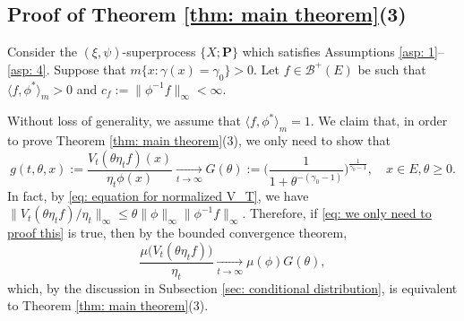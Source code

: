 \documentclass[12pt, a4paper]{amsart}
\theoremstyle{definition}
\numberwithin{equation}{section}
\begin{document}
\subsection{Proof of Theorem \ref{thm: main theorem}(3)}
\label{sec: proof of result 3}
	Consider the $(\xi, \psi)$-superprocess $\{X;\mathbf P\}$ which satisfies
	Assumptions \ref{asp: 1}--\ref{asp: 4}.
	Suppose that $m\{ x:\gamma(x)=\gamma_0 \}>0$.
	Let $f \in \mathscr B^+(E)$ be  such that $ \langle f, \phi^* \rangle_m > 0$  and $c_f :=\| \phi^{-1}f \|_\infty < \infty$.
	
	Without loss of generality, we assume that $\langle f, \phi^* \rangle_m = 1$.
	We claim that, in order to prove Theorem \ref{thm: main theorem}(3), we only need to show that
\begin{equation}\label{eq: we only need to proof this}
	g(t,\theta,x)
	:=\frac{V_t (\theta \eta_t f) (x)}{\eta_t \phi(x)}
	\xrightarrow[t\to \infty]{} G(\theta)
	:= \Big( \frac{1}{1+\theta^{-(\gamma_0 - 1)}} \Big)^{ \frac{1}{\gamma_0 - 1} },
	\quad x\in E, \theta \geq 0.
\end{equation}
	In fact, by \eqref{eq: equation for normalized V_T}, we have $\|V_t(\theta \eta_t f)/ \eta_t \|_\infty \leq \theta \|\phi\|_\infty \|\phi^{-1}f\|_\infty.$
	Therefore, if \eqref{eq: we only need to proof this} is true, then by the bounded convergence theorem,
\begin{equation}
	\frac{\mu\big(V_t (\theta \eta_t f)\big)}{\eta_t }
	\xrightarrow[t\to \infty]{} \mu(\phi)G(\theta),
\end{equation}
	which, by the discussion in Subsection \ref{sec: conditional distribution}, is equivalent to Theorem \ref{thm: main theorem}(3). 
		
\end{document}
